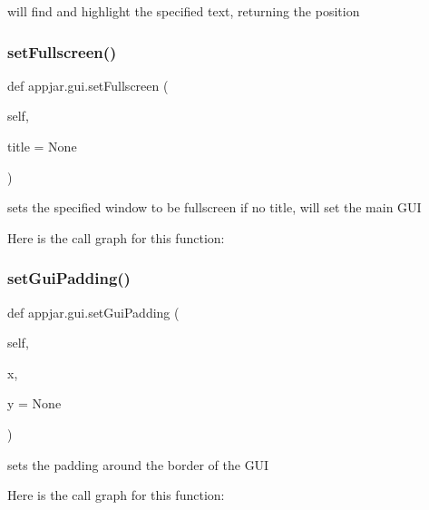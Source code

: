 \begin{DoxyVerb}
\begin{DoxyVerb}will find and highlight the specified text, returning the position \end{DoxyVerb}
 \mbox{\label{classappjar_1_1gui_ab87484f1715bcc51ad4e9d1235554c6b}} 
\subsubsection{\texorpdfstring{set\+Fullscreen()}{setFullscreen()}}
{\footnotesize\ttfamily def appjar.\+gui.\+set\+Fullscreen (\begin{DoxyParamCaption}\item[{}]{self,  }\item[{}]{title = {\ttfamily None} }\end{DoxyParamCaption})}

\begin{DoxyVerb}sets the specified window to be fullscreen
    if no title, will set the main GUI \end{DoxyVerb}
 Here is the call graph for this function\+:
\mbox{\label{classappjar_1_1gui_aa421d6c507945907169e871f36489fe4}} 
\subsubsection{\texorpdfstring{set\+Gui\+Padding()}{setGuiPadding()}}
{\footnotesize\ttfamily def appjar.\+gui.\+set\+Gui\+Padding (\begin{DoxyParamCaption}\item[{}]{self,  }\item[{}]{x,  }\item[{}]{y = {\ttfamily None} }\end{DoxyParamCaption})}

\begin{DoxyVerb}sets the padding around the border of the GUI \end{DoxyVerb}
 Here is the call graph for this function\+:
\mbox{\label{classappjar_1_1gui_afc9105b4a07285fb71c5fb253a13ec80}} 

\end{DoxyVerb}

